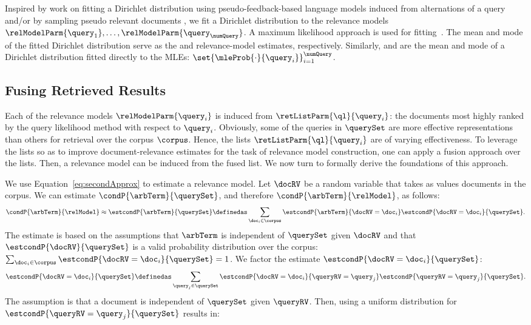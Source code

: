 Inspired by work on fitting a Dirichlet distribution using
pseudo-feedback-based language models induced from alternations of a
query and/or by sampling pseudo relevant documents \cite{Collins-Thompson+Callan:07a}, we fit a
Dirichlet distribution to the relevance models
$\relModelParm{\query_1},\ldots,\relModelParm{\query_{\numQuery}}$.
A maximum likelihood approach is used for 
fitting~\cite{Minka:00a}.
The mean and mode of the fitted Dirichlet distribution serve as the
\firstmention{\dirRMmean} and \firstmention{\dirRMmode}
relevance-model estimates, respectively.
Similarly, \firstmention{\dirMLEmean} and \firstmention{\dirMLEmode}
are the mean and mode of a Dirichlet distribution fitted directly to
the MLEs: $\set{\mleProb{\cdot}{\query_i}}_{i=1}^{\numQuery}$.

%
\subsection{Fusing Retrieved Results}
\label{sec:fuseRetList}
Each of the relevance models $\relModelParm{\query_{i}}$ is induced
from $\retListParm{\ql}{\query_i}$: the documents most highly ranked
by the query likelihood method with respect to $\query_i$.
Obviously, some of the queries in $\querySet$ are more effective
representations than others for retrieval over the corpus $\corpus$.
Hence, the lists $\retListParm{\ql}{\query_i}$ are of varying
effectiveness.
To leverage the lists so as to improve document-relevance estimates
for the task of relevance model construction, one can apply a fusion
approach over the lists.
Then, a relevance model can be induced from the fused list.
We now turn to formally derive the foundations of this approach.

We use Equation~\ref{eq:secondApprox} to estimate a relevance model.
Let $\docRV$ be a random variable that takes as values documents in
the corpus.
We can estimate $\condP{\arbTerm}{\querySet}$, and therefore
$\condP{\arbTerm}{\relModel}$, as follows:
\begin{equation}
\label{eq:partitionDoc}
\condP{\arbTerm}{\relModel} \approx \estcondP{\arbTerm}{\querySet} \definedas \sum_{\doc_i \in \corpus} \estcondP{\arbTerm}{\docRV = \doc_i}\estcondP{\docRV = \doc_i}{\querySet}.
\end{equation}
The estimate is based on the assumptions that $\arbTerm$ is
independent of $\querySet$ given $\docRV$ and that
$\estcondP{\docRV}{\querySet}$ is a valid probability distribution
over the corpus: $\sum_{\doc_i \in
\corpus}\estcondP{\docRV=\doc_i}{\querySet} =1$.
We factor the estimate $\estcondP{\docRV=\doc_i}{\querySet}$:
$$\estcondP{\docRV = \doc_i}{\querySet} \definedas \sum_{\query_j \in
\querySet}
\estcondP{\docRV=\doc_i}{\queryRV=\query_j}\estcondP{\queryRV=\query_j}{\querySet}.$$
The assumption is that a document is independent of $\querySet$ given
$\queryRV$.
Then, using a uniform distribution for
$\estcondP{\queryRV=\query_j}{\querySet}$ results in: 

